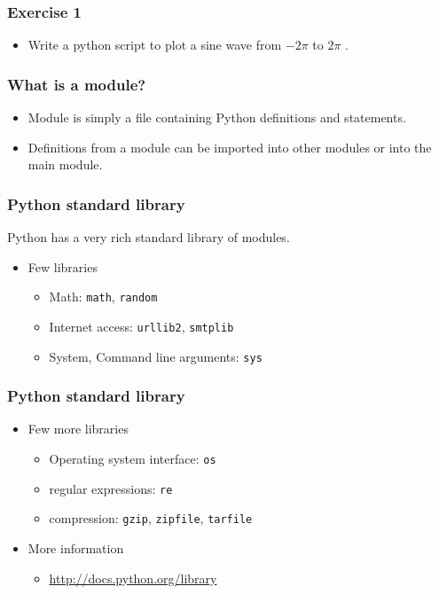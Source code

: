 \documentclass[17pt,compress]{beamer}
\begin{document}
\begin{frame}
\frametitle{Exercise 1}
\label{sec-12}

\begin{itemize}
\item Write a python script to plot a sine wave from 
    $-2\pi$
  to 
    $2\pi$
  .
\end{itemize}
\end{frame}
\begin{frame}
\frametitle{What is a module?}
\label{sec-13}
\begin{itemize}
\item Module is simply a file containing Python definitions and
  statements.\pause
\item Definitions from a module can be imported into other
  modules or into the main module.
\end{itemize}
  
\end{frame}
\begin{frame}
\frametitle{Python standard library}
\label{sec-14.1}

  Python has a very rich standard library of modules.\pause

\begin{itemize}
\item Few libraries
	\begin{itemize}
	\item Math: \texttt{math}, \texttt{random}\pause
	\item Internet access: \texttt{urllib2}, \texttt{smtplib}\pause
	\item System, Command line arguments: \texttt{sys}
	\end{itemize}
\end{itemize}
\end{frame}
\begin{frame}
\frametitle{Python standard library}
\label{sec-14.2}

\begin{itemize}
\item Few more libraries
	\begin{itemize}
	\item Operating system interface: \texttt{os}\pause
	\item regular expressions: \texttt{re}\pause
	\item compression: \texttt{gzip}, \texttt{zipfile}, \texttt{tarfile}
	\end{itemize}\pause
\item More information
	\begin{itemize}
	\item \href{http://docs.python.org/library}{http://docs.python.org/library}
	\end{itemize}
\end{itemize}
\end{frame}
\end{document}
